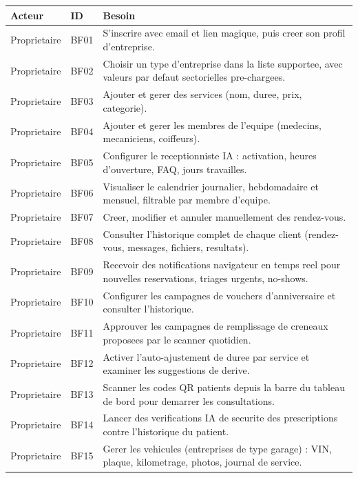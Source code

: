 \begin{table}[H]
  \centering\footnotesize
  \begin{tabular}{p{2.4cm}p{1.2cm}p{9.8cm}}
    \toprule
    \textbf{Acteur} & \textbf{ID} & \textbf{Besoin} \\
    \midrule
    Proprietaire & BF01 & S'inscrire avec email et lien magique, puis creer son profil d'entreprise. \\
    Proprietaire & BF02 & Choisir un type d'entreprise dans la liste supportee, avec valeurs par defaut sectorielles pre-chargees. \\
    Proprietaire & BF03 & Ajouter et gerer des services (nom, duree, prix, categorie). \\
    Proprietaire & BF04 & Ajouter et gerer les membres de l'equipe (medecins, mecaniciens, coiffeurs). \\
    Proprietaire & BF05 & Configurer le receptionniste IA : activation, heures d'ouverture, FAQ, jours travailles. \\
    Proprietaire & BF06 & Visualiser le calendrier journalier, hebdomadaire et mensuel, filtrable par membre d'equipe. \\
    Proprietaire & BF07 & Creer, modifier et annuler manuellement des rendez-vous. \\
    Proprietaire & BF08 & Consulter l'historique complet de chaque client (rendez-vous, messages, fichiers, resultats). \\
    Proprietaire & BF09 & Recevoir des notifications navigateur en temps reel pour nouvelles reservations, triages urgents, no-shows. \\
    Proprietaire & BF10 & Configurer les campagnes de vouchers d'anniversaire et consulter l'historique. \\
    Proprietaire & BF11 & Approuver les campagnes de remplissage de creneaux proposees par le scanner quotidien. \\
    Proprietaire & BF12 & Activer l'auto-ajustement de duree par service et examiner les suggestions de derive. \\
    Proprietaire & BF13 & Scanner les codes QR patients depuis la barre du tableau de bord pour demarrer les consultations. \\
    Proprietaire & BF14 & Lancer des verifications IA de securite des prescriptions contre l'historique du patient. \\
    Proprietaire & BF15 & Gerer les vehicules (entreprises de type garage) : VIN, plaque, kilometrage, photos, journal de service. \\

\end{tabular}
\end{table}
